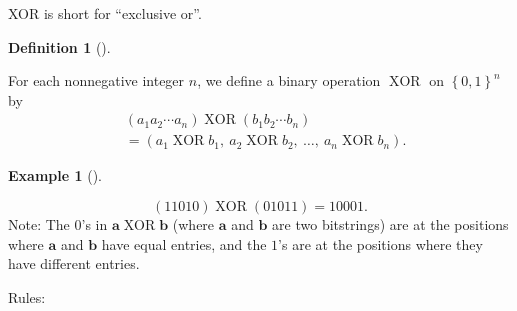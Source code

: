 \documentclass[numbers=enddot,12pt,final,onecolumn,notitlepage]{scrartcl}%
\numberwithin{exer}{section}
\theoremstyle{definition}
\newtheorem{defi}[theo]{Definition}
\newenvironment{definition}[1][]
{\begin{defi}[#1]\begin{leftbar}}
{\end{leftbar}\end{defi}}
\newtheorem{exam}[theo]{Example}
\newenvironment{example}[1][]
{\begin{exam}[#1]\begin{leftbar}}
{\end{leftbar}\end{exam}}
\begin{document}
XOR is short for \textquotedblleft exclusive or\textquotedblright.

\begin{definition}
For each nonnegative integer $n$, we define a binary operation
$\operatorname*{XOR}$ on $\left\{  0,1\right\}  ^{n}$ by%
\begin{align*}
& \left(  a_{1}a_{2}\cdots a_{n}\right)  \operatorname*{XOR}\left(  b_{1}%
b_{2}\cdots b_{n}\right)  \\
& =\left(  a_{1}\operatorname*{XOR}b_{1},\ a_{2}\operatorname*{XOR}%
b_{2},\ \ldots,\ a_{n}\operatorname*{XOR}b_{n}\right)  .
\end{align*}

\end{definition}

\begin{example}%
\[
\left(  11010\right)  \operatorname*{XOR}\left(  01011\right)  =10001.
\]
Note: The $0$'s in $\mathbf{a}\operatorname*{XOR}\mathbf{b}$ (where
$\mathbf{a}$ and $\mathbf{b}$ are two bitstrings) are at the positions where
$\mathbf{a}$ and $\mathbf{b}$ have equal entries, and the $1$'s are at the
positions where they have different entries.
\end{example}

Rules:
\end{document}
